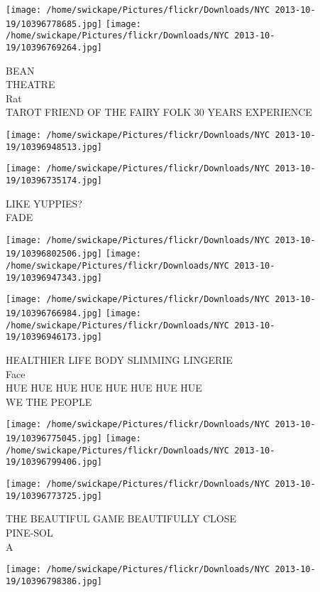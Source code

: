 \documentclass[10pt,letterpaper]{article}
\begin{document}
\texttt{[image: /home/swickape/Pictures/flickr/Downloads/NYC 2013-10-19/10396778685.jpg]}
\texttt{[image: /home/swickape/Pictures/flickr/Downloads/NYC 2013-10-19/10396769264.jpg]}

BEAN\\
THEATRE\\
Rat\\
TAROT FRIEND OF THE FAIRY FOLK 30 YEARS EXPERIENCE\\
\pagebreak

\texttt{[image: /home/swickape/Pictures/flickr/Downloads/NYC 2013-10-19/10396948513.jpg]}

\vspace{0.25in}
\texttt{[image: /home/swickape/Pictures/flickr/Downloads/NYC 2013-10-19/10396735174.jpg]}

LIKE YUPPIES?\\
FADE\\
\pagebreak

\texttt{[image: /home/swickape/Pictures/flickr/Downloads/NYC 2013-10-19/10396802506.jpg]}
\texttt{[image: /home/swickape/Pictures/flickr/Downloads/NYC 2013-10-19/10396947343.jpg]}

\texttt{[image: /home/swickape/Pictures/flickr/Downloads/NYC 2013-10-19/10396766984.jpg]}
\texttt{[image: /home/swickape/Pictures/flickr/Downloads/NYC 2013-10-19/10396946173.jpg]}

HEALTHIER LIFE BODY SLIMMING LINGERIE\\
Face\\
HUE HUE HUE HUE HUE HUE HUE HUE\\
WE THE PEOPLE\\
\pagebreak

\texttt{[image: /home/swickape/Pictures/flickr/Downloads/NYC 2013-10-19/10396775045.jpg]}
\texttt{[image: /home/swickape/Pictures/flickr/Downloads/NYC 2013-10-19/10396799406.jpg]}

\texttt{[image: /home/swickape/Pictures/flickr/Downloads/NYC 2013-10-19/10396773725.jpg]}

THE BEAUTIFUL GAME BEAUTIFULLY CLOSE\\
PINE{-}SOL\\
A\\
\pagebreak

\texttt{[image: /home/swickape/Pictures/flickr/Downloads/NYC 2013-10-19/10396798386.jpg]}
\end{document}
